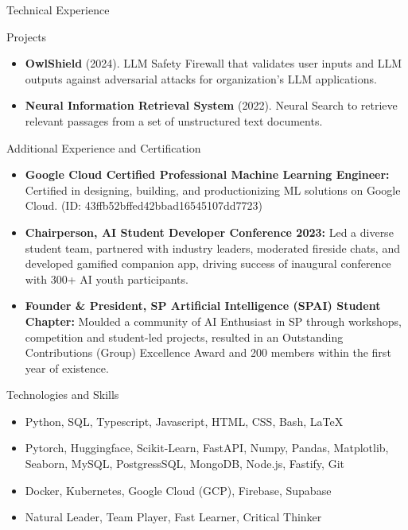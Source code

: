 \documentclass[]{mcdowellcv}
\begin{document}
    \begin{cvsection}{Technical Experience}
        \begin{cvsubsection}{Projects}{}{}
            \begin{itemize}
                \item \textbf{OwlShield} (2024). LLM Safety Firewall that validates user inputs and LLM outputs against adversarial attacks for organization’s LLM applications.
                \item \textbf{Neural Information Retrieval System} (2022). Neural Search to retrieve relevant passages from a set of unstructured text documents.
            \end{itemize}
        \end{cvsubsection}
	\end{cvsection}

	\begin{cvsection}{Additional Experience and Certification}
		\begin{cvsubsection}{}{}{}	
			\begin{itemize}
				\item \textbf{Google Cloud Certified Professional Machine Learning Engineer:} Certified in designing, building, and productionizing ML solutions on Google Cloud. (ID: 43ffb52bffed42bbad16545107dd7723)
				\item \textbf{Chairperson, AI Student Developer Conference 2023:} Led a diverse student team, partnered with industry leaders, moderated fireside chats, and developed gamified companion app, driving success of inaugural conference with 300+ AI youth participants.
				\item \textbf{Founder \& President, SP Artificial Intelligence (SPAI) Student Chapter:} Moulded a community of AI Enthusiast in SP through workshops, competition and student-led projects, resulted in an Outstanding Contributions (Group) Excellence Award and 200 members within the first year of existence.
			\end{itemize}
		\end{cvsubsection}
	\end{cvsection}
	
	\begin{cvsection}{Technologies and Skills}
		\begin{cvsubsection}{}{}{}	
			\begin{itemize}
				\item Python, SQL, Typescript, Javascript, HTML, CSS, Bash, \LaTeX
				\item Pytorch, Huggingface, Scikit-Learn, FastAPI, Numpy, Pandas, Matplotlib, Seaborn, MySQL, PostgressSQL, MongoDB, Node.js, Fastify, Git
				\item Docker, Kubernetes, Google Cloud (GCP), Firebase, Supabase
				\item Natural Leader, Team Player, Fast Learner, Critical Thinker
			\end{itemize}
		\end{cvsubsection}
	\end{cvsection}
	
\end{document}
